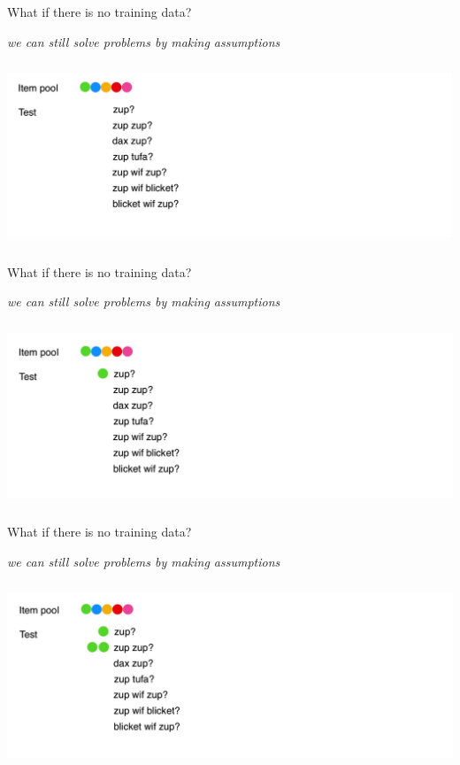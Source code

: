 \begin{frame}{What if there is no training data?}
\centerline{\textit{we can still solve problems by making assumptions}}
\centering\includegraphics[height=5.5cm]{image/img191412.jpg}

\end{frame}

\begin{frame}{What if there is no training data?}
\centerline{\textit{we can still solve problems by making assumptions}}
\centering\includegraphics[height=5.5cm]{image/img191823.jpg}

\end{frame}

\begin{frame}{What if there is no training data?}
\centerline{\textit{we can still solve problems by making assumptions}}
\centering\includegraphics[height=5.5cm]{image/img191448.jpg}

\end{frame}

